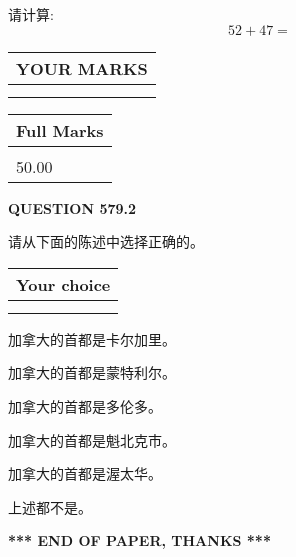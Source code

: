 \documentclass{ctexart}
\begin{document}
  
 
请计算:
\begin{equation}
52 +  %
47 = \nonumber
\end{equation}
 

 

 
  
\vspace{0.2in}
  
\noindent\begin{tabular}{|l|}
\hline
 YOUR MARKS  \\
\hline
 \\ 
 \\ 
\hline
\end{tabular}
\hspace{0.05in} \begin{tabular}{|l|}
\hline
 Full Marks  \\
\hline
 \\ 
50.00 \\
\hline
\end{tabular}
{\textbf{\Large{QUESTION
579.2 
}}}
  
  
请从下面的陈述中选择正确的。
  
  
\noindent\hspace{3.0in} \begin{tabular}{|l|}
\hline
Your choice \\
\hline
 \\ 
 \\ 
\hline
\end{tabular}
  
  
 
 
加拿大的首都是卡尔加里。
 
 
加拿大的首都是蒙特利尔。
 
 
加拿大的首都是多伦多。
 
 
加拿大的首都是魁北克市。
 
 
加拿大的首都是渥太华。
 
 
 上述都不是。
 
 
   
   
 \vspace{0.2in}
 
   
   
   
   
\vspace{1.0in} 
{\textbf{\large{ *** END OF PAPER, THANKS *** }}} 
   
\end{document}
